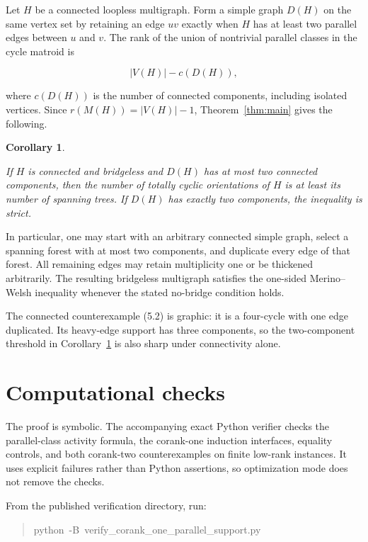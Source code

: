 \documentclass[11pt]{article}
\newtheorem{corollary}[theorem]{Corollary}
\begin{document}
Let \(H\) be a connected loopless multigraph. Form a simple graph \(D(H)\)
on the same vertex set by retaining an edge \(uv\) exactly when \(H\) has at
least two parallel edges between \(u\) and \(v\). The rank of the union of
nontrivial parallel classes in the cycle matroid is

\[
|V(H)|-c(D(H)),
\]

where \(c(D(H))\) is the number of connected components, including isolated
vertices. Since \(r(M(H))=|V(H)|-1\), Theorem~\ref{thm:main} gives the following.

\Needspace{0.18\textheight}
\begin{corollary}
\label{cor:graphic}

If \(H\) is connected and bridgeless and \(D(H)\) has at most two connected
components, then the number of totally cyclic orientations of \(H\) is at
least its number of spanning trees. If \(D(H)\) has exactly two components,
the inequality is strict.

\end{corollary}

In particular, one may start with an arbitrary connected simple graph, select
a spanning forest with at most two components, and duplicate every edge of
that forest. All remaining edges may retain multiplicity one or be thickened
arbitrarily. The resulting bridgeless multigraph satisfies the one-sided
Merino--Welsh inequality whenever the stated no-bridge condition holds.

The connected counterexample (5.2) is graphic: it is a four-cycle with one
edge duplicated. Its heavy-edge support has three components, so the
two-component threshold in Corollary~\ref{cor:graphic} is also sharp under connectivity
alone.

\section{Computational checks}


The proof is symbolic. The accompanying exact Python verifier checks the
parallel-class activity formula, the corank-one induction interfaces, equality
controls, and both corank-two counterexamples on finite low-rank instances.
It uses explicit failures rather than Python assertions, so optimization mode
does not remove the checks.

From the published verification directory, run:

\begin{quote}\footnotesize\ttfamily
python\ \allowbreak{}-\allowbreak{}B\ \allowbreak{}verify\_\allowbreak{}corank\_\allowbreak{}one\_\allowbreak{}parallel\_\allowbreak{}support.py\par
\end{quote}
\end{document}
